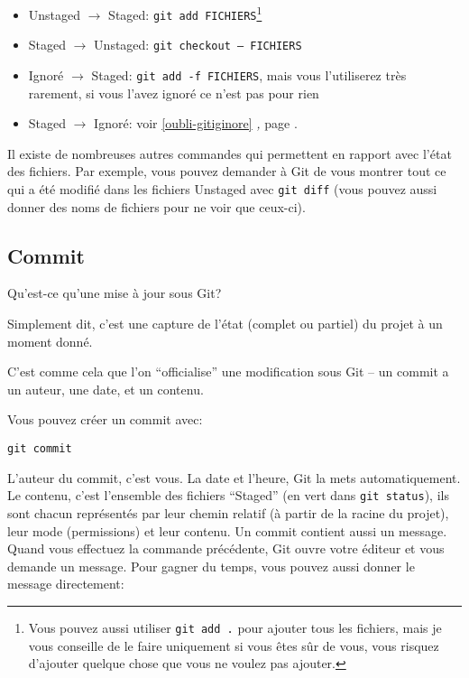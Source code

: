 \documentclass[10pt,a4paper]{article}
\begin{document}
\begin{itemize}
\item Unstaged $\rightarrow$ Staged: \texttt{git add FICHIERS}\footnote{Vous pouvez aussi utiliser {\tt git add .} pour ajouter tous les fichiers, mais je vous conseille de le faire uniquement si vous êtes sûr de vous, vous risquez d'ajouter quelque chose que vous ne voulez pas ajouter.}
\item Staged $\rightarrow$ Unstaged: \texttt{git checkout -- FICHIERS}
\item Ignoré $\rightarrow$ Staged: \texttt{git add -f FICHIERS}, mais vous l'utiliserez très rarement, si vous l'avez ignoré ce n'est pas pour rien
\item Staged $\rightarrow$ Ignoré: voir \ref{oubli-gitiginore} \textit{,} page \pageref{oubli-gitiginore}.
\end{itemize}

Il existe de nombreuses autres commandes qui permettent en rapport avec l'état des fichiers. Par exemple, vous pouvez demander à Git de vous montrer tout ce qui a été modifié dans les fichiers Unstaged avec {\tt git diff} (vous pouvez aussi donner des noms de fichiers pour ne voir que ceux-ci).

\subsection{Commit\label{commit}}

Qu'est-ce qu'une mise à jour sous Git?

Simplement dit, c'est une capture de l'état (complet ou partiel) du projet à un moment donné.

C'est comme cela que l'on ``officialise'' une modification sous Git -- un commit a un auteur, une date, et un contenu.

Vous pouvez créer un commit avec:

\begin{verbatim}
git commit
\end{verbatim}

L'auteur du commit, c'est vous. La date et l'heure, Git la mets automatiquement. Le contenu, c'est l'ensemble des fichiers ``Staged'' (en vert dans {\tt git status}), ils sont chacun représentés par leur chemin relatif (à partir de la racine du projet), leur mode (permissions) et leur contenu. Un commit contient aussi un message. Quand vous effectuez la commande précédente, Git ouvre votre éditeur et vous demande un message. Pour gagner du temps, vous pouvez aussi donner le message directement:
\end{document}
